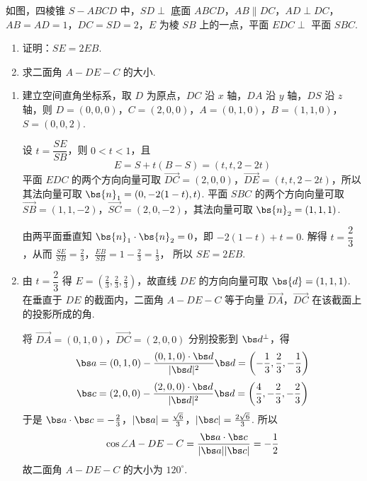 \begin{problem}
如图，四棱锥 \(S - ABCD\) 中，\(SD \perp\) 底面 \(ABCD\)，\(AB \parallel DC\)，\(AD \perp DC\)，\(AB = AD = 1\)，\(DC = SD = 2\)，\(E\) 为棱 \(SB\) 上的一点，平面 \(EDC \perp\) 平面 \(SBC\).

\begin{enumerate}
\item 证明：\(SE = 2EB\).
\item 求二面角 \(A - DE - C\) 的大小.
\end{enumerate}

\end{problem}

\begin{solution}
\begin{enumerate}
\item 建立空间直角坐标系，取 \(D\) 为原点，\(DC\) 沿 \(x\) 轴，\(DA\) 沿 \(y\) 轴，\(DS\) 沿 \(z\) 轴，则 \(D=(0,0,0)\)，\(C=(2,0,0)\)，\(A=(0,1,0)\)，\(B=(1,1,0)\)，\(S=(0,0,2)\).

设 \(t=\dfrac{SE}{SB}\)，则 \(0<t<1\)，且
\[
E=S+t(B-S)=(t,t,2-2t)
\]
平面 \(EDC\) 的两个方向向量可取
\(\overrightarrow{DC}=(2,0,0)\)，\(\overrightarrow{DE}=(t,t,2-2t)\)，所以其法向量可取
\(\bs{n}_1=(0,-2(1-t),t)\). 平面 \(SBC\) 的两个方向向量可取
\(\overrightarrow{SB}=(1,1,-2)\)，\(\overrightarrow{SC}=(2,0,-2)\)，其法向量可取
\(\bs{n}_2=(1,1,1)\).

由两平面垂直知 \(\bs{n}_1\cdot\bs{n}_2=0\)，即
\(-2(1-t)+t=0\). 解得 \(t=\dfrac23\)，从而
\(\frac{SE}{SB}=\frac23\)，\(\frac{EB}{SB}=1-\frac23=\frac13\)，
所以 \(SE=2EB\).
\item 由 \(t=\dfrac23\) 得 \(E=(\frac23,\frac23,\frac23)\)，故直线 \(DE\) 的方向向量可取
\(\bs{d}=(1,1,1)\). 在垂直于 \(DE\) 的截面内，二面角 \(A-DE-C\) 等于向量
\(\overrightarrow{DA}\)，\(\overrightarrow{DC}\) 在该截面上的投影所成的角.

将 \(\overrightarrow{DA}=(0,1,0)\)，\(\overrightarrow{DC}=(2,0,0)\) 分别投影到 \(\bs d^\perp\)，得
\[
\bs a=(0,1,0)-\frac{(0,1,0)\cdot\bs d}{|\bs d|^2}\bs d
=\left(-\frac13,\frac23,-\frac13\right)
\]
\[
\bs c=(2,0,0)-\frac{(2,0,0)\cdot\bs d}{|\bs d|^2}\bs d
=\left(\frac43,-\frac23,-\frac23\right)
\]
于是 \(\bs a\cdot\bs c=-\frac23\)，\(|\bs a|=\frac{\sqrt6}{3}\)，\(|\bs c|=\frac{2\sqrt6}{3}\).
所以
\[
\cos\angle A-DE-C=\frac{\bs a\cdot\bs c}{|\bs a||\bs c|}=-\frac12
\]
故二面角 \(A-DE-C\) 的大小为 \(120^{\circ}\).
\end{enumerate}
\end{solution}

